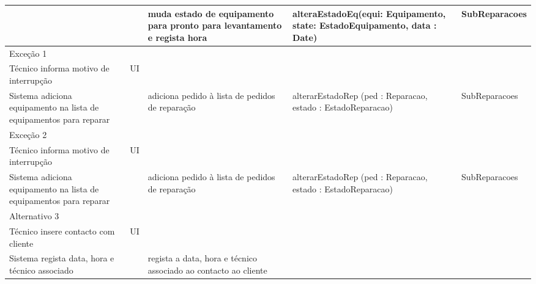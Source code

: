 \documentclass[../relatorio.tex]{subfiles}
\begin{document}
\begin{landscape}
\begin{table}[!h]
\begin{tabular}{|p{5cm}|p{1cm}|p{4cm}|p{6cm}|p{3cm}|}
                     & 
                     & muda estado de equipamento para pronto para levantamento e regista hora
                     & alteraEstadoEq(equi: Equipamento, state: EstadoEquipamento, data : Date)
                     & SubReparacoes
            \\
            \hline
            \rowcolor{red!30}
            Exceção 1 &                                                  &                  &     &            \\
            \hline
            \rowcolor{yellow}
            Técnico informa motivo de interrupção
                     & UI
                     & 
                     & 
                     & 
            \\
            \hline
            Sistema adiciona equipamento na lista de equipamentos para reparar
                     & 
                     & adiciona pedido à lista de pedidos de reparação 
                     & alterarEstadoRep (ped : Reparacao, estado : EstadoReparacao)
                     & SubReparacoes
            \\
            \hline
            \rowcolor{red!30}
            Exceção 2 &                                                  &                  &     &            \\
            \hline
            \rowcolor{yellow}
            Técnico informa motivo de interrupção
                     & UI
                     & 
                     & 
                     & 
            \\
            \hline
            Sistema adiciona equipamento na lista de equipamentos para reparar
                     & 
                     & adiciona pedido à lista de pedidos de reparação 
                     & alterarEstadoRep (ped : Reparacao, estado : EstadoReparacao)
                     & SubReparacoes
            \\
            \hline
            \rowcolor{red!30}
            Alternativo 3 &                                                  &                  &     &            \\
            \hline
            \rowcolor{yellow}
            Técnico insere contacto com cliente
                     & UI
                     & 
                     & 
                     & 
            \\
            \hline
            Sistema regista data, hora e técnico associado
                     & 
                     & regista a data, hora e técnico associado ao contacto ao cliente 

\end{tabular}
\end{table}
\end{landscape}
\end{document}
